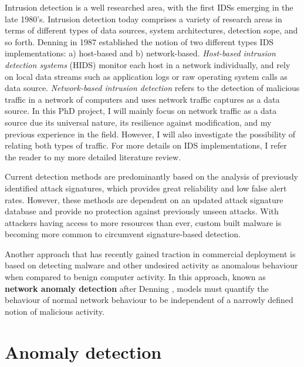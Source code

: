 \documentclass[a4paper,12pt,twoside]{report}
\begin{document}
Intrusion detection is a well researched area, with the first IDSs emerging in the late 1980's. Intrusion detection today comprises a variety of research areas in terms of different types of data sources, system architectures, detection sope, and so forth. Denning \cite{denning1987intrusion} in 1987 established the notion of two different types IDS implementations: a) host-based and b) network-based. 
\textit{Host-based intrusion detection systems} (HIDS) monitor each host in a network individually, and rely on local data streams such as application logs or raw operating system calls as  data source. \textit{Network-based intrusion detection} refers to the detection of malicious traffic in a network of computers and uses network traffic captures as a data source. In this PhD project, I will mainly focus on network traffic as a data source due its universal nature, its resilience against modification, and my previous experience in the field. However, I will also investigate the possibility of relating both types of traffic. For more details on IDS implementations, I refer the reader to my more detailed literature review. 


Current detection methods are predominantly based on the analysis of previously identified attack signatures, which provides great reliability and low false alert rates. However, these methods are dependent on an updated attack signature database and provide no protection against previously unseen attacks. With attackers having access to more resources than ever, custom built malware is becoming more common to circumvent signature-based detection. 

Another approach that has recently gained traction in commercial deployment is based on detecting malware and other undesired activity as anomalous behaviour when compared to benign computer activity. In this approach, known as \textbf{network anomaly detection} after Denning \cite{denning1987intrusion}, models must quantify the behaviour of normal network behaviour to be independent of a narrowly defined notion of malicious activity.



\section{Anomaly detection}
\end{document}
